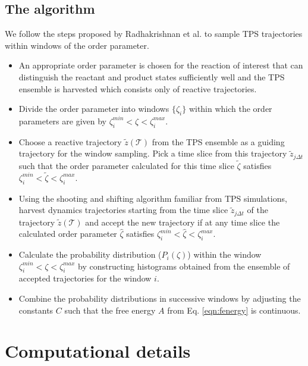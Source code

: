 \documentclass[journal=jpcbfk,manuscript=article,layout=traditional]{achemso}
\begin{document}
\subsection{The algorithm}
We follow the steps proposed by Radhakrishnan et al. \cite{Radhakrishnan04JChemPhys121p2436} 
to sample TPS trajectories within windows of the order parameter. 
\begin{itemize}
  \item An appropriate order parameter is chosen for the reaction of interest 
  that can distinguish the reactant and product states sufficiently well and the TPS ensemble is harvested 
  which consists only of reactive trajectories.
\item Divide the order parameter into windows $\{\zeta_i\}$ within which the 
order parameters are given by 
$\zeta_{i}^{min} < \zeta < \zeta_{i}^{max}$.
\item Choose a reactive trajectory $\tilde{z}(\mathcal{T})$ from the TPS ensemble as 
a guiding trajectory for the window sampling. Pick a time slice from this trajectory 
$\tilde{z}_{j\Delta t}$ such that the order parameter calculated for this time slice
$\tilde{\zeta}$ satisfies $\zeta_{i}^{min} < \tilde{\zeta} < \zeta_{i}^{max}$.
\item Using the shooting and shifting algorithm familiar from TPS simulations, \cite{dellago02AdvChemPhys123}
harvest dynamics trajectories starting from the time slice $\tilde{z}_{j\Delta t}$ of the trajectory 
  $\tilde{z}(\mathcal{T})$ and accept the new trajectory if at any time slice the calculated 
  order parameter $\hat{\zeta}$ satisfies $\zeta_{i}^{min} < \hat{\zeta} < \zeta_{i}^{max}$.
  \item Calculate the probability distribution ($P_i(\zeta)$) within the window $\zeta_{i}^{min} 
  < \zeta < \zeta_{i}^{max}$ by constructing histograms obtained from the ensemble of 
  accepted trajectories for the window $i$. 
  \item Combine the probability distributions in successive windows by adjusting the constants $C$
  such that the free energy $A$ from Eq. \ref{eqn:fenergy} is continuous. 
\end{itemize}
\section{Computational details}
\end{document}
